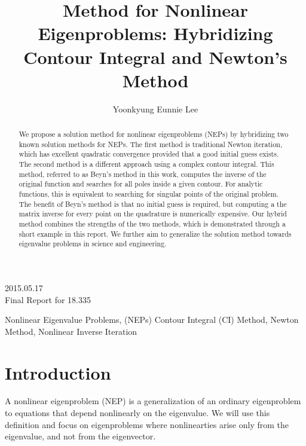 \documentclass[final,leqno,onefignum,onetabnum]{siamltex1213}
\title{Method for Nonlinear Eigenproblems: Hybridizing Contour Integral and Newton's Method}
\author{Yoonkyung Eunnie Lee \footnotemark[2]}
\begin{document}
\maketitle
\begin{flushright}
2015.05.17\\
Final Report for 18.335 \\
\end{flushright}

\begin{abstract}
We propose a solution method for nonlinear eigenproblems (NEPs) by hybridizing two known solution methods for NEPs. The first method is traditional Newton iteration, which has excellent quadratic convergence provided that a good initial guess exists. The second method is a different approach using a complex contour integral. This method, referred to as Beyn's method in this work, computes the inverse of the original function and searches for all poles inside a given contour. For analytic functions, this is equivalent to searching for singular points of the original problem. The benefit of Beyn's method is that no initial guess is required, but computing a the matrix inverse for every point on the quadrature is numerically expensive. Our hybrid method combines the strengths of the two methods, which is demonstrated through a short example in this report. We further aim to generalize the solution method towards eigenvalue problems in science and engineering. 

\end{abstract}
\begin{keywords} Nonlinear Eigenvalue Problems, (NEPs) Contour Integral (CI) Method, Newton Method, Nonlinear Inverse Iteration \end{keywords}
\section{Introduction} 

A nonlinear eigenproblem (NEP) is a generalization of an ordinary eigenproblem to equations that depend nonlinearly on the eigenvalue. We will use this definition and focus on eigenproblems where nonlinearties arise only from the eigenvalue, and not from the eigenvector. 
\end{document}
